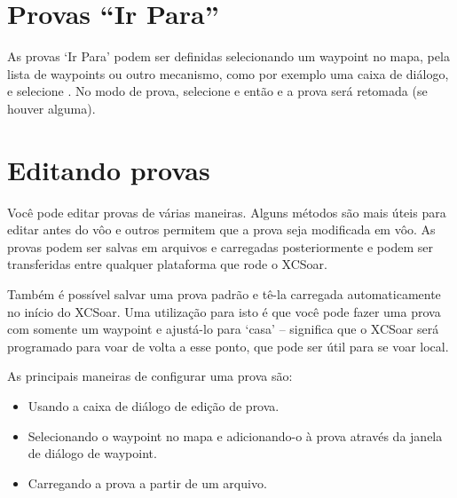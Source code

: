 \section{Provas “Ir Para”}

As provas ‘Ir Para’ podem ser definidas selecionando um waypoint no mapa, pela lista de waypoints ou outro mecanismo, como por exemplo uma caixa de diálogo, e selecione  . No modo de prova, selecione
 e então \blink{} e a prova será retomada (se houver alguma).
 

\section{Editando provas}

Você pode editar provas de várias maneiras. Alguns métodos são mais úteis para editar antes do vôo e outros permitem que a prova seja modificada em vôo.  As provas podem ser salvas em arquivos e carregadas posteriormente e podem ser transferidas entre qualquer plataforma que rode o XCSoar.

\tip Também é possível salvar uma prova padrão e tê-la carregada automaticamente no início do XCSoar.  Uma utilização para isto é que você pode fazer uma prova com somente um waypoint e ajustá-lo para ‘casa’ – significa que o XCSoar será programado para voar de volta a esse ponto, que pode ser útil para se voar local.

As principais maneiras de configurar uma prova são:
\begin{itemize}
\item Usando a caixa de diálogo de edição de prova.
\item Selecionando o waypoint no mapa e adicionando-o à prova através da janela de diálogo de waypoint.
\item Carregando a prova a partir de um arquivo.
\end{itemize}

%

